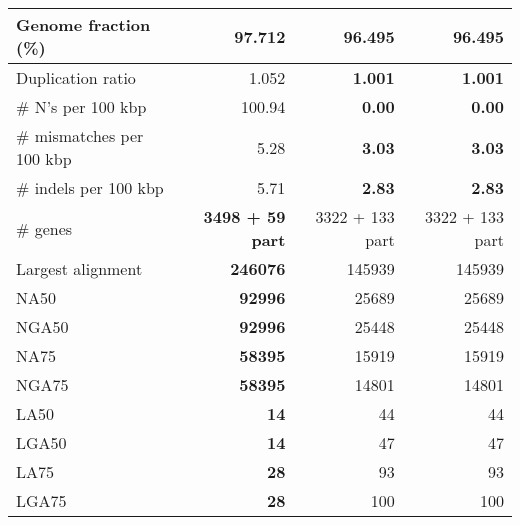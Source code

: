 \documentclass[12pt,a4paper]{article}
\begin{document}
\begin{table}[ht]
\begin{center}
\begin{tabular}{|l*{3}{|r}|}
Genome fraction (\%) & {\bf 97.712} & 96.495 & 96.495 \\ \hline
Duplication ratio & 1.052 & {\bf 1.001} & {\bf 1.001} \\ \hline
\# N's per 100 kbp & 100.94 & {\bf 0.00} & {\bf 0.00} \\ \hline
\# mismatches per 100 kbp & 5.28 & {\bf 3.03} & {\bf 3.03} \\ \hline
\# indels per 100 kbp & 5.71 & {\bf 2.83} & {\bf 2.83} \\ \hline
\# genes & {\bf 3498 + 59 part} & 3322 + 133 part & 3322 + 133 part \\ \hline
Largest alignment & {\bf 246076} & 145939 & 145939 \\ \hline
NA50 & {\bf 92996} & 25689 & 25689 \\ \hline
NGA50 & {\bf 92996} & 25448 & 25448 \\ \hline
NA75 & {\bf 58395} & 15919 & 15919 \\ \hline
NGA75 & {\bf 58395} & 14801 & 14801 \\ \hline
LA50 & {\bf 14} & 44 & 44 \\ \hline
LGA50 & {\bf 14} & 47 & 47 \\ \hline
LA75 & {\bf 28} & 93 & 93 \\ \hline
LGA75 & {\bf 28} & 100 & 100 \\ \hline
\end{tabular}
\end{center}
\end{table}
\end{document}
